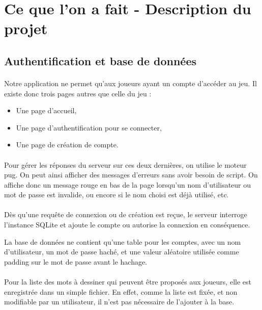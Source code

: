 \documentclass[11pt,a4paper]{article}
\begin{document}
    \section{Ce que l'on a fait - Description du projet}
        \subsection{Authentification et base de données}
            \paragraph{}
            Notre application ne permet qu'aux joueurs ayant un compte d'accéder au jeu.
            Il existe donc trois pages autres que celle du jeu :
            \begin{itemize}
                \item Une page d'accueil,
                \item Une page d'authentification pour se connecter,
                \item Une page de création de compte.
            \end{itemize}
            \paragraph{}
            Pour gérer les réponses du serveur sur ces deux dernières,
            on utilise le moteur pug.
            On peut ainsi afficher des messages d'erreurs sans avoir besoin de script.
            On affiche donc un message rouge en bas de la page lorsqu'un nom d'utilisateur ou mot de passe est invalide,
            ou encore si le nom choisi est déjà utilisé, etc.
            \paragraph{}
            Dès qu'une requête de connexion ou de création est reçue,
            le serveur interroge l'instance SQLite et ajoute le compte ou autorise la connexion en conséquence.

            La base de données ne contient qu'une table pour les comptes, avec un nom d'utilisateur, un mot de passe haché,
            et une valeur aléatoire utilisée comme padding sur le mot de passe avant le hachage.
            \paragraph{}
            Pour la liste des mots à dessiner qui peuvent être proposés aux joueurs,
            elle est enregistrée dans un simple fichier.
            En effet, comme la liste est fixée, et non modifiable par un utilisateur,
            il n'est pas nécessaire de l'ajouter à la base.
\end{document}
